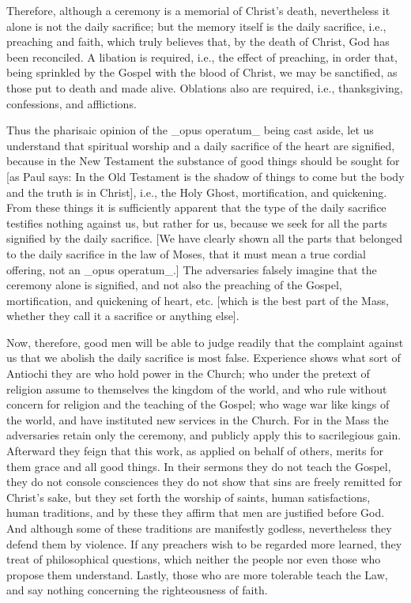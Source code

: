 Therefore, although a ceremony is a memorial of Christ's death,
nevertheless it alone is not the daily sacrifice; but the memory
itself is the daily sacrifice, i.e., preaching and faith, which truly
believes that, by the death of Christ, God has been reconciled.  A
libation is required, i.e., the effect of preaching, in order that,
being sprinkled by the Gospel with the blood of Christ, we may be
sanctified, as those put to death and made alive.  Oblations also are
required, i.e., thanksgiving, confessions, and afflictions.

Thus the pharisaic opinion of the _opus operatum_ being cast aside,
let us understand that spiritual worship and a daily sacrifice of the
heart are signified, because in the New Testament the substance of
good things should be sought for [as Paul says: In the Old Testament
is the shadow of things to come but the body and the truth is in
Christ], i.e., the Holy Ghost, mortification, and quickening.  From
these things it is sufficiently apparent that the type of the daily
sacrifice testifies nothing against us, but rather for us, because we
seek for all the parts signified by the daily sacrifice.  [We have
clearly shown all the parts that belonged to the daily sacrifice in
the law of Moses, that it must mean a true cordial offering, not an
_opus operatum_.] The adversaries falsely imagine that the ceremony
alone is signified, and not also the preaching of the Gospel,
mortification, and quickening of heart, etc. [which is the best part
of the Mass, whether they call it a sacrifice or anything else].

Now, therefore, good men will be able to judge readily that the
complaint against us that we abolish the daily sacrifice is most
false.  Experience shows what sort of Antiochi they are who hold
power in the Church; who under the pretext of religion assume to
themselves the kingdom of the world, and who rule without concern for
religion and the teaching of the Gospel; who wage war like kings of
the world, and have instituted new services in the Church.  For in
the Mass the adversaries retain only the ceremony, and publicly apply
this to sacrilegious gain.  Afterward they feign that this work, as
applied on behalf of others, merits for them grace and all good
things.  In their sermons they do not teach the Gospel, they do not
console consciences they do not show that sins are freely remitted
for Christ's sake, but they set forth the worship of saints, human
satisfactions, human traditions, and by these they affirm that men
are justified before God.  And although some of these traditions are
manifestly godless, nevertheless they defend them by violence.  If
any preachers wish to be regarded more learned, they treat of
philosophical questions, which neither the people nor even those who
propose them understand.  Lastly, those who are more tolerable teach
the Law, and say nothing concerning the righteousness of faith.

